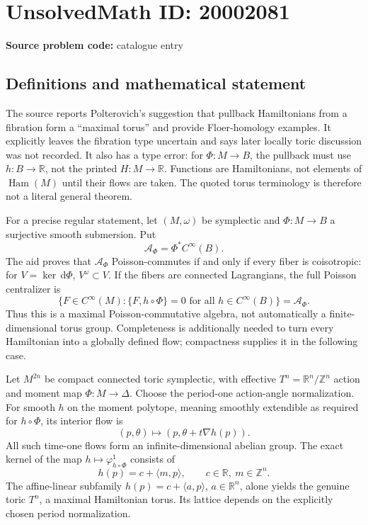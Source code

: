 \documentclass[11pt]{article}
\newcommand{\Z}{\mathbb{Z}}
\newcommand{\R}{\mathbb{R}}
\newcommand{\dd}{\,\mathrm{d}}
\begin{document}
\section*{UnsolvedMath ID: 20002081}
\textbf{Source problem code:} catalogue entry
\subsection{Definitions and mathematical statement}
The source reports Polterovich's suggestion that pullback Hamiltonians from a fibration form a ``maximal torus'' and provide Floer-homology examples. It explicitly leaves the fibration type uncertain and says later locally toric discussion was not recorded. It also has a type error: for \(\Phi:M\to B\), the pullback must use \(h:B\to\R\), not the printed \(H:M\to\R\). Functions are Hamiltonians, not elements of \(\operatorname{Ham}(M)\) until their flows are taken. The quoted torus terminology is therefore not a literal general theorem.

For a precise regular statement, let \((M,\omega)\) be symplectic and \(\Phi:M\to B\) a surjective smooth submersion. Put
\[
 \mathcal A_\Phi=\Phi^*C^\infty(B).
\]
The aid proves that \(\mathcal A_\Phi\) Poisson-commutes if and only if every fiber is coisotropic: for \(V=\ker\dd\Phi\), \(V^\omega\subset V\). If the fibers are connected Lagrangians, the full Poisson centralizer is
\[
 \{F\in C^\infty(M):\{F,h\circ\Phi\}=0\text{ for all }h\in C^\infty(B)\}
       =\mathcal A_\Phi.
\]
Thus this is a maximal Poisson-commutative algebra, not automatically a finite-dimensional torus group. Completeness is additionally needed to turn every Hamiltonian into a globally defined flow; compactness supplies it in the following case.

Let \(M^{2n}\) be compact connected toric symplectic, with effective \(T^n=\R^n/\Z^n\) action and moment map \(\Phi:M\to\Delta\). Choose the period-one action-angle normalization. For smooth \(h\) on the moment polytope, meaning smoothly extendible as required for \(h\circ\Phi\), its interior flow is
\[
 (p,\theta)\longmapsto(p,\theta+t\nabla h(p)).
\]
All such time-one flows form an infinite-dimensional abelian group. The exact kernel of the map \(h\mapsto\varphi_{h\circ\Phi}^1\) consists of
\[
 h(p)=c+\langle m,p\rangle,\qquad c\in\R,\ m\in\Z^n.
\]
The affine-linear subfamily \(h(p)=c+\langle a,p\rangle\), \(a\in\R^n\), alone yields the genuine toric \(T^n\), a maximal Hamiltonian torus. Its lattice depends on the explicitly chosen period normalization.
\end{document}

